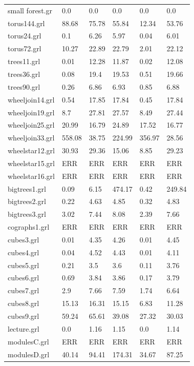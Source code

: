 \documentclass[11pt]{article}
\begin{document}
\begin{table}[h!]
\begin{tabularx}{\textwidth}{|l|X|X|X|X|X|}
		small forest.gr & 0.0 & 0.0 & 0.0 & 0.0 & 0.0 \\
		torus144.grl & 88.68 & 75.78 & 55.84 & 12.34 & 53.76 \\
		torus24.grl & 0.1 & 6.26 & 5.97 & 0.04 & 6.01 \\
		torus72.grl & 10.27 & 22.89 & 22.79 & 2.01 & 22.12 \\
		trees11.grl & 0.01 & 12.28 & 11.87 & 0.02 & 12.08 \\
		trees36.grl & 0.08 & 19.4 & 19.53 & 0.51 & 19.66 \\
		trees90.grl & 0.26 & 6.86 & 6.93 & 0.85 & 6.88 \\
		wheeljoin14.grl & 0.54 & 17.85 & 17.84 & 0.45 & 17.84 \\
		wheeljoin19.grl & 8.7 & 27.81 & 27.57 & 8.49 & 27.44 \\
		wheeljoin25.grl & 20.99 & 16.79 & 24.89 & 17.52 & 16.77 \\
		wheeljoin33.grl & 558.08 & 38.75 & 224.99 & 356.97 & 28.56 \\
		wheelstar12.grl & 30.93 & 29.36 & 15.06 & 8.85 & 29.23 \\
		wheelstar15.grl & ERR & ERR & ERR & ERR & ERR \\
		wheelstar16.grl & ERR & ERR & ERR & ERR & ERR \\
		bigtrees1.grl & 0.09 & 6.15 & 474.17 & 0.42 & 249.84 \\
		bigtrees2.grl & 0.22 & 4.63 & 4.85 & 0.32 & 4.83 \\
		bigtrees3.grl & 3.02 & 7.44 & 8.08 & 2.39 & 7.66 \\
		cographs1.grl & ERR & ERR & ERR & ERR & ERR \\
		cubes3.grl & 0.01 & 4.35 & 4.26 & 0.01 & 4.45 \\
		cubes4.grl & 0.04 & 4.52 & 4.43 & 0.01 & 4.11 \\
		cubes5.grl & 0.21 & 3.5 & 3.6 & 0.11 & 3.76 \\
		cubes6.grl & 0.69 & 3.84 & 3.86 & 0.17 & 3.79 \\
		cubes7.grl & 2.9 & 7.66 & 7.59 & 1.74 & 6.64 \\
		cubes8.grl & 15.13 & 16.31 & 15.15 & 6.83 & 11.28 \\
		cubes9.grl & 59.24 & 65.61 & 39.08 & 27.32 & 30.03 \\
		lecture.grl & 0.0 & 1.16 & 1.15 & 0.0 & 1.14 \\
		modulesC.grl & ERR & ERR & ERR & ERR & ERR \\
		modulesD.grl & 40.14 & 94.41 & 174.31 & 34.67 & 87.25 \\

\end{tabularx}
\end{table}
\end{document}
